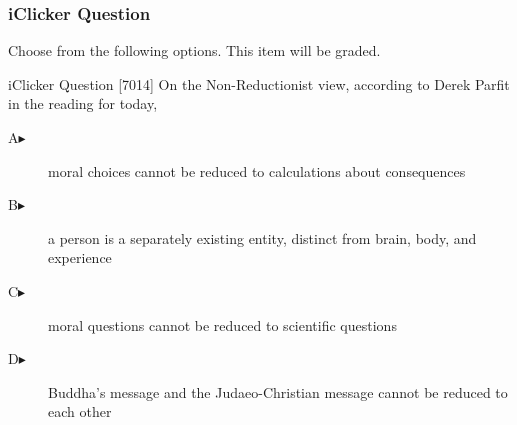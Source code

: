 \begin{frame}
  \frametitle{iClicker Question}
Choose from the following options. This item will be graded.
\begin{block}{iClicker Question}
[7014] On the Non-Reductionist view, according to Derek Parfit in the reading for today,
\end{block}
\begin{description}
\item[A\hspace{.2in}$\blacktriangleright$] moral choices cannot be reduced to calculations about consequences
\item[B\hspace{.2in}$\blacktriangleright$] a person is a separately existing entity, distinct from brain, body, and experience
\item[C\hspace{.2in}$\blacktriangleright$] moral questions cannot be reduced to scientific questions
\item[D\hspace{.2in}$\blacktriangleright$] Buddha's message and the Judaeo-Christian message cannot be reduced to each other
\end{description}
\end{frame}
